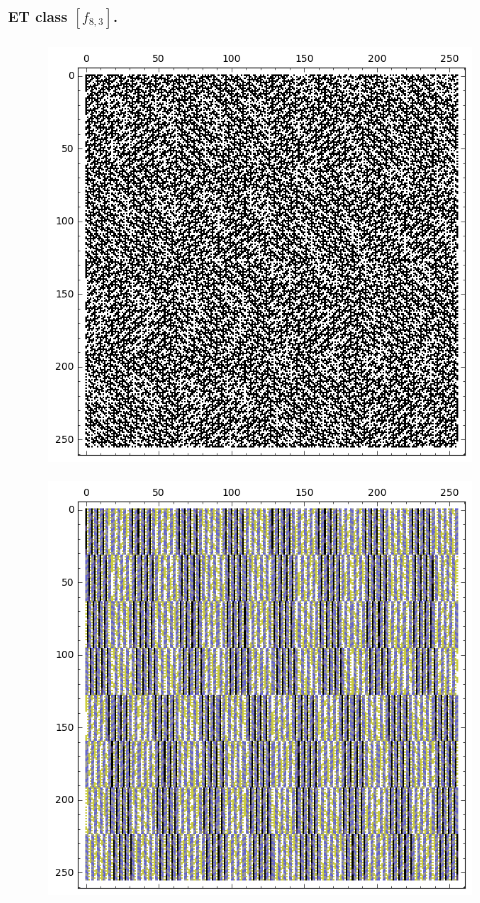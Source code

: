 \documentclass[12pt,a4paper]{article}
\begin{document}
\paragraph*{ET class $[f_{8,3}]$.}
\begin{figure}[!hb]
\centering
\begin{minipage}{.48\textwidth}
  \centering
  \includegraphics[width=.9\linewidth]{../matrix_plot/re8_3_weight_class_matrix.png}
  \label{fig:8_3_weight_class_matrix}
\end{minipage}%
\begin{minipage}{.48\textwidth}
  \centering
  \includegraphics[width=.9\linewidth]{../matrix_plot/re8_3_bent_cayley_graph_index_matrix.png}
  \label{fig:8_3_bent_cayley_graph_index_matrix}
\end{minipage}
\end{figure}
~
\end{document}
